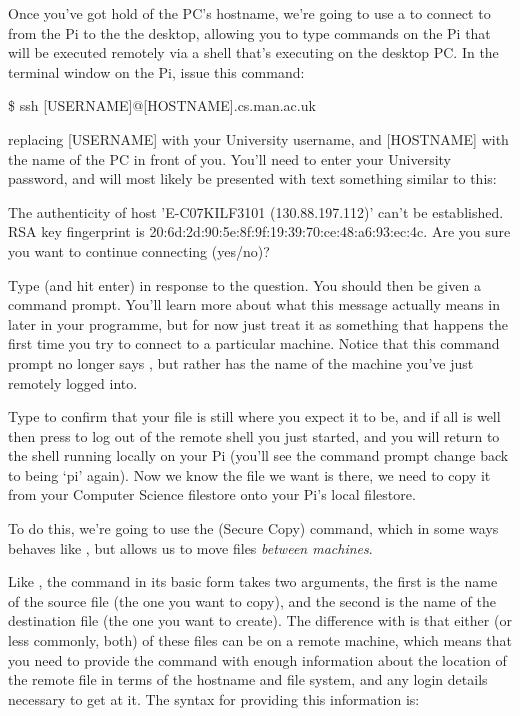 Once you've got hold of the PC's hostname, we're going to use a  to connect to from the Pi to the the desktop, allowing you to type commands on the Pi that will be executed remotely via a shell that's executing on the desktop PC. In the terminal window on the Pi, issue this command:

\begin{ttoutenv}
\$ ssh [USERNAME]@[HOSTNAME].cs.man.ac.uk
\end{ttoutenv}

replacing [USERNAME] with your University username, and [HOSTNAME] with the name of the PC in front of you. You'll need to enter your University password, and will most likely be presented with text something similar to this:

\begin{ttoutenv}
The authenticity of host 'E-C07KILF3101 (130.88.197.112)' can't be established.
RSA key fingerprint is 20:6d:2d:90:5e:8f:9f:19:39:70:ce:48:a6:93:ec:4c.
Are you sure you want to continue connecting (yes/no)? 
\end{ttoutenv}

Type  (and hit enter) in response to the question. You should then be given a command prompt. You'll learn more about what this message actually means in later in your programme, but for now just treat it as something that happens the first time you try to connect to a particular machine. Notice that this command prompt no longer says , but rather has the name of the machine you've just remotely logged into. 

Type  to confirm that your  file is still where you expect it to be, and if all is well then press  to log out of the remote shell you just started, and you will return to the shell running locally on your Pi (you'll see the command prompt change back to being `pi' again). Now we know the file we want is there, we need to copy it from your Computer Science filestore onto your Pi's local filestore.

To do this, we're going to use the  (Secure Copy) command, which in some ways behaves like , but allows us to move files \textit{between machines}. 

Like , the  command in its basic form takes two arguments, the first is the name of the source file (the one you want to copy), and the second is the name of the destination file (the one you want to create). The difference with  is that either (or less commonly, both) of these files can be on a remote machine, which means that you need to provide the command with enough information about the location of the remote file in terms of the hostname and file system, and any login details necessary to get at it. The syntax for providing this information is:

